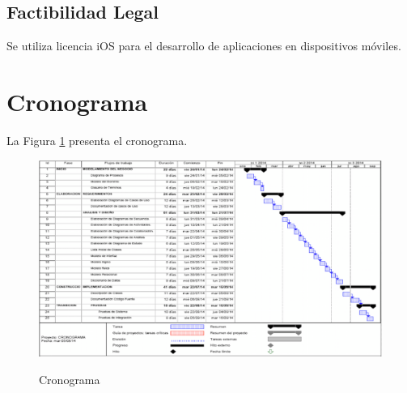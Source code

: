 \subsection{Factibilidad Legal}
Se utiliza licencia iOS para el desarrollo de aplicaciones en dispositivos móviles.

\section{Cronograma}
La Figura \ref{fig:Cronograma} presenta el cronograma.

\begin{landscape}
\begin{figure}[ht] 
\centering
\caption{Cronograma}
\includegraphics[width=1.2\textwidth]{img/cronograma.png}
\label{fig:Cronograma}  
\end{figure} 
\end{landscape}